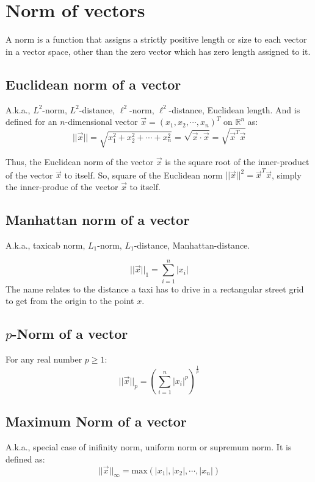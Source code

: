 \documentclass[conference,final,11pt,technote,onecolumn]{IEEEtran}\usepackage[]{graphicx}\usepackage[]{color}
\begin{document}
\section{Norm of vectors}
\label{term:norm_of_vectors}
A norm is a function that assigns a strictly positive length or size to each vector in a vector space, other than the zero vector which has zero length assigned to it.

\subsection{Euclidean norm of a vector}
\label{term:euclidean_norm}
A.k.a., $L^2$-norm, $L^2$-distance, $\ell^2$-norm, $\ell^2$-distance, Euclidean length. And is defined for an $n$-dimensional vector $\vec x = (x_1,x_2,\cdots, x_n)^T$ on $\mathbb{R}^n$ as:
\[
||\vec x|| = \sqrt{x^2_1+x^2_2+\cdots+x^2_n} = \sqrt{\vec x \cdot \vec x} = \sqrt{\vec x^T \vec x}
\]

Thus, the Euclidean norm of the vector $\vec x$ is the square root of the inner-product of the vector $\vec x$ to itself. So, square of the Euclidean norm $||\vec x||^2 = \vec x^T\vec x$, simply the inner-produc of the vector $\vec x$ to itself.

\subsection{Manhattan norm of a vector}
\label{term:manhattan_norm}
A.k.a., taxicab norm, $L_1$-norm, $L_1$-distance, Manhattan-distance. 

\[ ||\vec x||_1 = \sum_{i=1}^n|x_i|\]
The name relates to the distance a taxi has to drive in a rectangular street grid to get from the origin to the point $x$.


\subsection{$p$-Norm of a vector}
\label{term:p-norm}
For any real number $p\ge 1$:
\begin{equation}
\nonumber ||\vec x||_p = \left( \sum_{i=1}^n|x_i|^p\right)^{\frac{1}{p}}
\end{equation}

\subsection{Maximum Norm of a vector}
\label{term:maximum_norm}
A.k.a., special case of inifinity norm, uniform norm or supremum norm. It is defined as:
\begin{equation}
\nonumber ||\vec x||_\infty = \text{max}\left( |x_1|, |x_2|, \cdots, |x_n|\right)
\end{equation}
\end{document}
